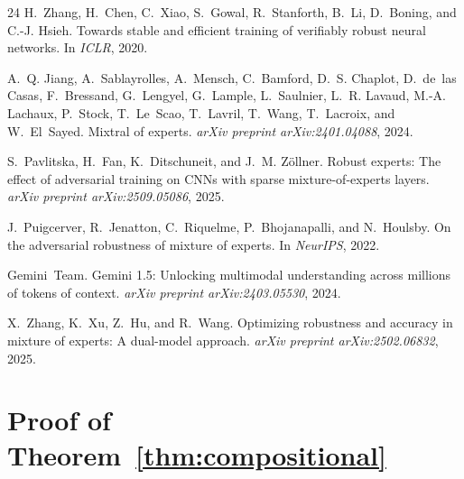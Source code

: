 \documentclass{article}
\theoremstyle{plain}
\theoremstyle{remark}
\begin{document}
\begin{thebibliography}{24}
H.~Zhang, H.~Chen, C.~Xiao, S.~Gowal, R.~Stanforth, B.~Li, D.~Boning, and C.-J. Hsieh.
\newblock Towards stable and efficient training of verifiably robust neural networks.
\newblock In \emph{ICLR}, 2020.

A.~Q. Jiang, A.~Sablayrolles, A.~Mensch, C.~Bamford, D.~S. Chaplot, D.~de~las Casas, F.~Bressand, G.~Lengyel, G.~Lample, L.~Saulnier, L.~R. Lavaud, M.-A. Lachaux, P.~Stock, T.~Le~Scao, T.~Lavril, T.~Wang, T.~Lacroix, and W.~El~Sayed.
\newblock Mixtral of experts.
\newblock \emph{arXiv preprint arXiv:2401.04088}, 2024.

S.~Pavlitska, H.~Fan, K.~Ditschuneit, and J.~M. Z{\"o}llner.
\newblock Robust experts: The effect of adversarial training on CNNs with sparse mixture-of-experts layers.
\newblock \emph{arXiv preprint arXiv:2509.05086}, 2025.

J.~Puigcerver, R.~Jenatton, C.~Riquelme, P.~Bhojanapalli, and N.~Houlsby.
\newblock On the adversarial robustness of mixture of experts.
\newblock In \emph{NeurIPS}, 2022.

Gemini~Team.
\newblock Gemini 1.5: Unlocking multimodal understanding across millions of tokens of context.
\newblock \emph{arXiv preprint arXiv:2403.05530}, 2024.

X.~Zhang, K.~Xu, Z.~Hu, and R.~Wang.
\newblock Optimizing robustness and accuracy in mixture of experts: A dual-model approach.
\newblock \emph{arXiv preprint arXiv:2502.06832}, 2025.

\end{thebibliography}

\newpage
\appendix

\section{Proof of Theorem~\ref{thm:compositional}}
\label{app:proof}
\end{document}
